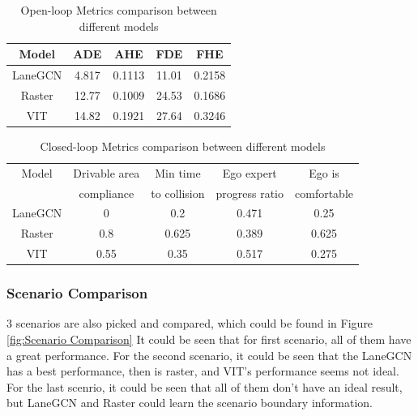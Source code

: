 \documentclass[10pt,conference,compsocconf]{IEEEtran}
\begin{document}
\begin{table}[h]
    \centering
    \begin{tabular}{c|c|c|c|c}
        Model & ADE & AHE & FDE & FHE \\
        \hline
        LaneGCN & 4.817&0.1113&11.01&0.2158\\
        Raster & 12.77 & 0.1009 & 24.53 & 0.1686 \\
        VIT& 14.82& 0.1921&27.64&0.3246
    \end{tabular}
    \caption{Open-loop Metrics comparison between different models
}
    \label{tab:open-loop}
\end{table}
\begin{table}[h]
    \centering
    \begin{tabular}{c|c|c|c|c}
       Model  & Drivable area  & Min
       time  & Ego expert   & Ego is 
       \\
       &compliance&to collision&
       progress ratio&comfortable\\
       \hline
        LaneGCN & 0& 0.2 & 0.471 & 0.25\\
        Raster & 0.8 & 0.625 & 0.389 & 0.625\\
        VIT & 0.55 & 0.35 & 0.517 & 0.275
    \end{tabular}
    \caption{Closed-loop Metrics comparison between different models
}
    \label{tab:Closed-loop}
\end{table}
\subsubsection{Scenario Comparison}
3 scenarios are also picked and compared, which could be found in Figure \ref{fig:Scenario Comparison} It could be seen that for first scenario, all of them have a great performance. For the second scenario, it could be seen that the LaneGCN has a best performance, then is raster, and VIT’s performance seems not ideal. For the last scenrio, it could be seen that all of them don’t have an ideal result, but LaneGCN and Raster could learn the scenario boundary information.
\end{document}

